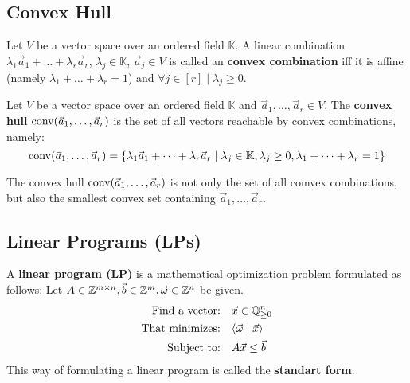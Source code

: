 \subsection{Convex Hull}
\begin{definition}
    \label{def:convex_hull}
    Let $V$ be a vector space over an ordered field $\mathbb{K}$. A linear combination $\lambda_1 \vec a_1 + \dots + \lambda_r \vec a_r$, $\lambda_j \in \mathbb{K}$, $\vec a_j \in V$ is called an \textbf{convex combination} iff it is affine (namely $\lambda_1 + \dots + \lambda_r = 1$) and $\forall j\in[r]\mid \lambda_j \geq 0$.
\end{definition}
\begin{definition}
    Let $V$ be a vector space over an ordered field $\mathbb{K}$ and $\vec a_1, \dots, \vec a_r \in V$. The \textbf{convex hull} $\operatorname{conv}(\vec a_1, \dots, \vec a_r)$ is the set of all vectors reachable by convex combinations, namely:
    $$\operatorname{conv}(\vec a_1, \dots, \vec a_r) = \{\lambda_1 \vec a_1 + \dots + \lambda_r \vec a_r \mid \lambda_j \in \mathbb{K}, \lambda_j \geq 0, \lambda_1 + \dots + \lambda_r = 1\}$$
\end{definition}
\begin{observation}
    The convex hull $\operatorname{conv}(\vec a_1, \dots, \vec a_r)$ is not only the set of all comvex combinations, but also the smallest convex set containing $\vec a_1, \dots, \vec a_r$.
\end{observation}

\subsection{Linear Programs (LPs)}
\begin{definition}
    A \textbf{linear program (LP)} is a mathematical optimization problem formulated as follows: Let $A\in\mathbb{Z}^{m\times n}, \vec b \in \mathbb{Z}^m, \vec\omega \in \mathbb{Z}^n$ be given.
    \begin{align*}
        \text{Find a vector:} & \quad \vec x \in \mathbb{Q}^n_{\geq 0} \\
        \text{That minimizes:} & \quad \langle \vec \omega \mid \vec x \rangle\\
        \text{Subject to:} & \quad A\vec x \leq \vec b \\
    \end{align*}
    This way of formulating a linear program is called the \textbf{standart form}.
\end{definition}

